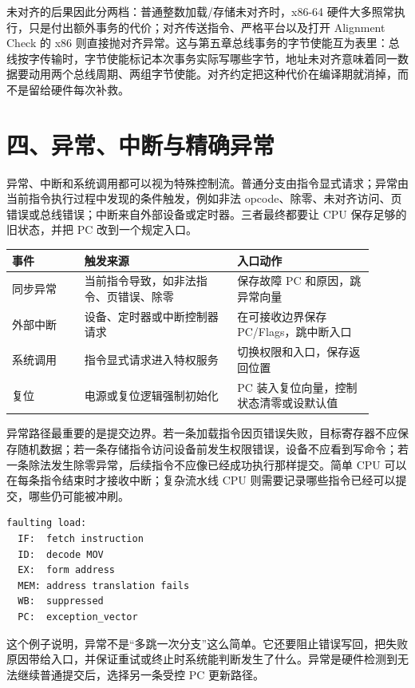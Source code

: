 未对齐的后果因此分两档：普通整数加载/存储未对齐时，x86-64 硬件大多照常执行，只是付出额外事务的代价；对齐传送指令、严格平台以及打开 Alignment Check 的 x86 则直接抛对齐异常。这与第五章总线事务的字节使能互为表里：总线按字传输时，字节使能标记本次事务实际写哪些字节，地址未对齐意味着同一数据要动用两个总线周期、两组字节使能。对齐约定把这种代价在编译期就消掉，而不是留给硬件每次补救。

\section{四、异常、中断与精确异常}

异常、中断和系统调用都可以视为特殊控制流。普通分支由指令显式请求；异常由当前指令执行过程中发现的条件触发，例如非法 opcode、除零、未对齐访问、页错误或总线错误；中断来自外部设备或定时器。三者最终都要让 CPU 保存足够的旧状态，并把 PC 改到一个规定入口。

\begin{longtable}{L{0.18\linewidth}L{0.38\linewidth}L{0.34\linewidth}}
\toprule
事件 & 触发来源 & 入口动作 \\
\midrule
同步异常 & 当前指令导致，如非法指令、页错误、除零 & 保存故障 PC 和原因，跳异常向量 \\
外部中断 & 设备、定时器或中断控制器请求 & 在可接收边界保存 PC/Flags，跳中断入口 \\
系统调用 & 指令显式请求进入特权服务 & 切换权限和入口，保存返回位置 \\
复位 & 电源或复位逻辑强制初始化 & PC 装入复位向量，控制状态清零或设默认值 \\
\bottomrule
\end{longtable}

异常路径最重要的是提交边界。若一条加载指令因页错误失败，目标寄存器不应保存随机数据；若一条存储指令访问设备前发生权限错误，设备不应看到写命令；若一条除法发生除零异常，后续指令不应像已经成功执行那样提交。简单 CPU 可以在每条指令结束时才接收中断；复杂流水线 CPU 则需要记录哪些指令已经可以提交，哪些仍可能被冲刷。

\begin{lstlisting}
faulting load:
  IF:  fetch instruction
  ID:  decode MOV
  EX:  form address
  MEM: address translation fails
  WB:  suppressed
  PC:  exception_vector
\end{lstlisting}

这个例子说明，异常不是“多跳一次分支”这么简单。它还要阻止错误写回，把失败原因带给入口，并保证重试或终止时系统能判断发生了什么。异常是硬件检测到无法继续普通提交后，选择另一条受控 PC 更新路径。

